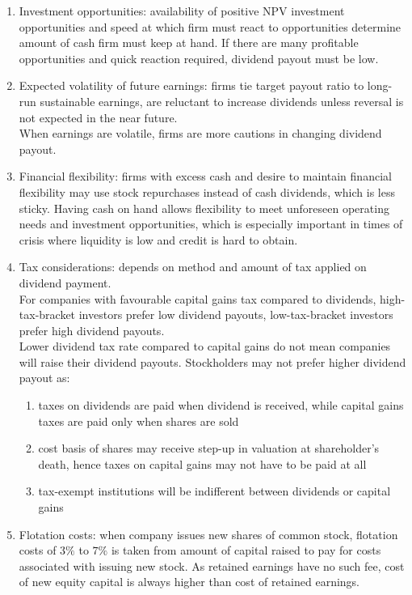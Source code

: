\begin{remark} 
\begin{enumerate}[label=\roman*.]
\setlength{\itemsep}{0pt}
\item Investment opportunities: availability of positive NPV investment opportunities and speed at which firm must react to opportunities determine amount of cash firm must keep at hand. If there are many profitable opportunities and quick reaction required, dividend payout must be low.
\item Expected volatility of future earnings: firms tie target payout ratio to long-run sustainable earnings, are reluctant to increase dividends unless reversal is not expected in the near future.\\
When earnings are volatile, firms are more cautions in changing dividend payout.
\item Financial flexibility: firms with excess cash and desire to maintain financial flexibility may use stock repurchases instead of cash dividends, which is less sticky. Having cash on hand allows flexibility to meet unforeseen operating needs and investment opportunities, which is especially important in times of crisis where liquidity is low and credit is hard to obtain.
\item Tax considerations: depends on method and amount of tax applied on dividend payment.\\
For companies with favourable capital gains tax compared to dividends, high-tax-bracket investors prefer low dividend payouts, low-tax-bracket investors prefer high dividend payouts.\\
Lower dividend tax rate compared to capital gains do not mean companies will raise their dividend payouts. Stockholders may not prefer higher dividend payout as:
\begin{enumerate}[label=\arabic*.]
\setlength{\itemsep}{0pt}
\item taxes on dividends are paid when dividend is received, while capital gains taxes are paid only when shares are sold
\item cost basis of shares may receive step-up in valuation at shareholder's death, hence taxes on capital gains may not have to be paid at all
\item tax-exempt institutions will be indifferent between dividends or capital gains
\end{enumerate}
\item Flotation costs: when company issues new shares of common stock, flotation costs of $3\%$ to $7\%$ is taken from amount of capital raised to pay for costs associated with issuing new stock. As retained earnings have no such fee, cost of new equity capital is always higher than cost of retained earnings.\\

\end{enumerate}
\end{remark}
